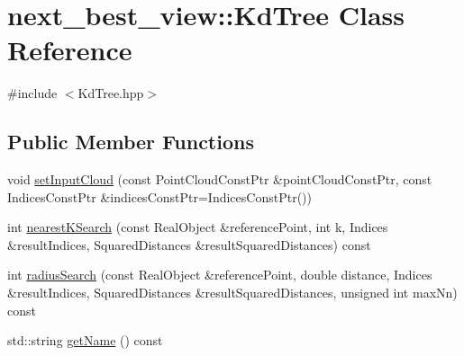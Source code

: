 \hypertarget{classnext__best__view_1_1KdTree}{\section{next\-\_\-best\-\_\-view\-:\-:\-Kd\-Tree \-Class \-Reference}
\label{classnext__best__view_1_1KdTree}
}


{\ttfamily \#include $<$\-Kd\-Tree.\-hpp$>$}

\subsection*{\-Public \-Member \-Functions}
\begin{DoxyCompactItemize}
\item 
void \hyperlink{classnext__best__view_1_1KdTree_ae2ffbca6b9804287827dfaa49027d617}{set\-Input\-Cloud} (const \-Point\-Cloud\-Const\-Ptr \&point\-Cloud\-Const\-Ptr, const \-Indices\-Const\-Ptr \&indices\-Const\-Ptr=\-Indices\-Const\-Ptr())
\item 
int \hyperlink{classnext__best__view_1_1KdTree_a570d91ef93d9504821796bc4db333292}{nearest\-K\-Search} (const \-Real\-Object \&reference\-Point, int k, \-Indices \&result\-Indices, \-Squared\-Distances \&result\-Squared\-Distances) const 
\item 
int \hyperlink{classnext__best__view_1_1KdTree_ad163788a1640679bbd81c8be19b4c9dd}{radius\-Search} (const \-Real\-Object \&reference\-Point, double distance, \-Indices \&result\-Indices, \-Squared\-Distances \&result\-Squared\-Distances, unsigned int max\-Nn) const 
\item 
std\-::string \hyperlink{classnext__best__view_1_1KdTree_a981ea325af5d0333683bf93b56db3ec1}{get\-Name} () const 
\end{DoxyCompactItemize}


